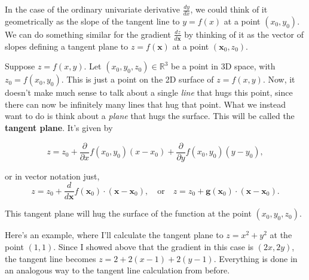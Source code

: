 \documentclass[
  letterpaper,
  DIV=11,
  numbers=noendperiod]{scrreprt}
\begin{document}
In the case of the ordinary univariate derivative \(\frac{dy}{dx}\), we
could think of it geometrically as the slope of the tangent line to
\(y=f(x)\) at a point \((x_0,y_0)\). We can do something similar for the
gradient \(\frac{dz}{d\mathbf{x}}\) by thinking of it as the vector of
slopes defining a tangent plane to \(z=f(\mathbf{x})\) at a point
\((\mathbf{x}_0, z_0)\).

Suppose \(z=f(x,y)\). Let \((x_0,y_0,z_0) \in \mathbb{R}^3\) be a point
in 3D space, with \(z_0=f(x_0,y_0)\). This is just a point on the 2D
surface of \(z=f(x,y)\). Now, it doesn't make much sense to talk about a
single \emph{line} that hugs this point, since there can now be
infinitely many lines that hug that point. What we instead want to do is
think about a \emph{plane} that hugs the surface. This will be called
the \textbf{tangent plane}. It's given by

\[z = z_0 + \frac{\partial}{\partial x}f(x_0,y_0) (x - x_0) + \frac{\partial}{\partial y}f(x_0,y_0) (y - y_0),\]

or in vector notation just,
\[z = z_0 + \frac{d}{d\mathbf{x}} f(\mathbf{x}_0) \cdot (\mathbf{x} - \mathbf{x}_0), \quad \text{or} \quad z = z_0 + \mathbf{g}(\mathbf{x}_0) \cdot (\mathbf{x} - \mathbf{x}_0).\]

This tangent plane will hug the surface of the function at the point
\((x_0,y_0,z_0)\).

Here's an example, where I'll calculate the tangent plane to
\(z=x^2+y^2\) at the point \((1,1)\). Since I showed above that the
gradient in this case is \((2x, 2y)\), the tangent line becomes
\(z=2 + 2(x-1) + 2(y-1)\). Everything is done in an analogous way to the
tangent line calculation from before.
\end{document}
